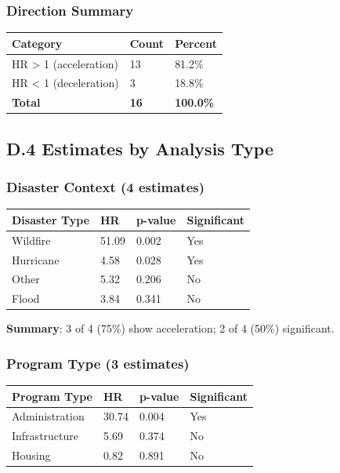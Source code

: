 \documentclass[
  12pt,
  letterpaper,
]{article}
\begin{document}
\subsubsection{Direction Summary}\label{direction-summary}

\begin{longtable}[]{@{}lll@{}}
\toprule\noalign{}
Category & Count & Percent \\
\midrule\noalign{}
\endhead
\bottomrule\noalign{}
\endlastfoot
HR \textgreater{} 1 (acceleration) & 13 & 81.2\% \\
HR \textless{} 1 (deceleration) & 3 & 18.8\% \\
\textbf{Total} & \textbf{16} & \textbf{100.0\%} \\
\end{longtable}

\subsection{D.4 Estimates by Analysis
Type}\label{d.4-estimates-by-analysis-type}

\subsubsection{Disaster Context (4
estimates)}\label{disaster-context-4-estimates}

\begin{longtable}[]{@{}llll@{}}
\toprule\noalign{}
Disaster Type & HR & p-value & Significant \\
\midrule\noalign{}
\endhead
\bottomrule\noalign{}
\endlastfoot
Wildfire & 51.09 & 0.002 & Yes \\
Hurricane & 4.58 & 0.028 & Yes \\
Other & 5.32 & 0.206 & No \\
Flood & 3.84 & 0.341 & No \\
\end{longtable}

\textbf{Summary}: 3 of 4 (75\%) show acceleration; 2 of 4 (50\%)
significant.

\subsubsection{Program Type (3
estimates)}\label{program-type-3-estimates}

\begin{longtable}[]{@{}llll@{}}
\toprule\noalign{}
Program Type & HR & p-value & Significant \\
\midrule\noalign{}
\endhead
\bottomrule\noalign{}
\endlastfoot
Administration & 30.74 & 0.004 & Yes \\
Infrastructure & 5.69 & 0.374 & No \\
Housing & 0.82 & 0.891 & No \\
\end{longtable}
\end{document}
